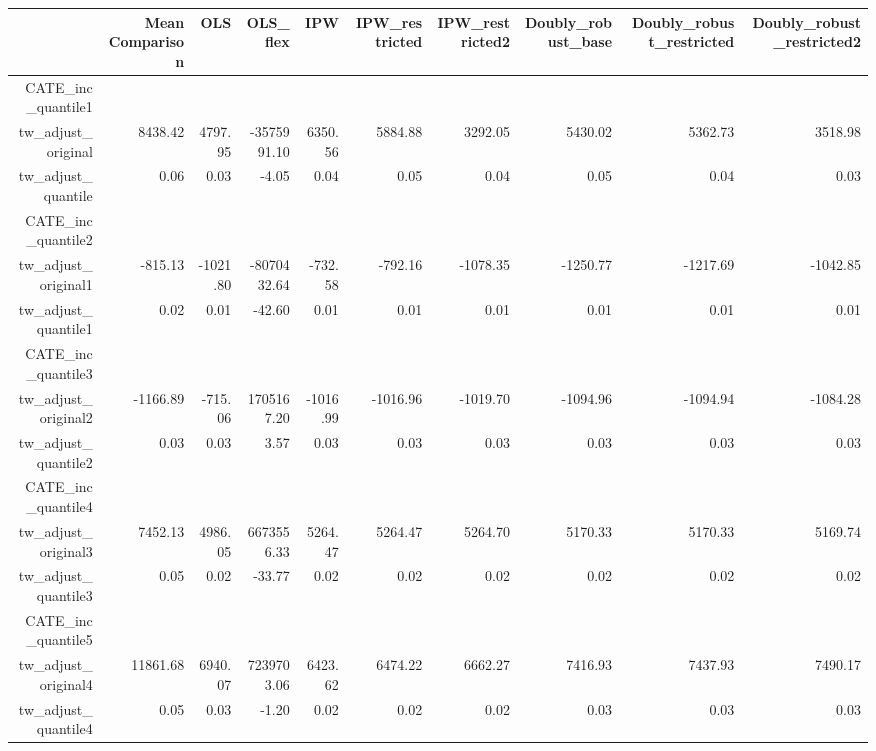 \begin{table}[ht]
\centering
\begin{tabular}{rrrrrrrrrr}
  \hline
 & Mean Comparison & OLS & OLS\_flex & IPW & IPW\_restricted & IPW\_restricted2 & Doubly\_robust\_base & Doubly\_robust\_restricted & Doubly\_robust\_restricted2 \\ 
  \hline
CATE\_inc\_quantile1 &  &  &  &  &  &  &  &  &  \\ 
  tw\_adjust\_original & 8438.42 & 4797.95 & -3575991.10 & 6350.56 & 5884.88 & 3292.05 & 5430.02 & 5362.73 & 3518.98 \\ 
  tw\_adjust\_quantile & 0.06 & 0.03 & -4.05 & 0.04 & 0.05 & 0.04 & 0.05 & 0.04 & 0.03 \\ 
  CATE\_inc\_quantile2 &  &  &  &  &  &  &  &  &  \\ 
  tw\_adjust\_original1 & -815.13 & -1021.80 & -8070432.64 & -732.58 & -792.16 & -1078.35 & -1250.77 & -1217.69 & -1042.85 \\ 
  tw\_adjust\_quantile1 & 0.02 & 0.01 & -42.60 & 0.01 & 0.01 & 0.01 & 0.01 & 0.01 & 0.01 \\ 
  CATE\_inc\_quantile3 &  &  &  &  &  &  &  &  &  \\ 
  tw\_adjust\_original2 & -1166.89 & -715.06 & 1705167.20 & -1016.99 & -1016.96 & -1019.70 & -1094.96 & -1094.94 & -1084.28 \\ 
  tw\_adjust\_quantile2 & 0.03 & 0.03 & 3.57 & 0.03 & 0.03 & 0.03 & 0.03 & 0.03 & 0.03 \\ 
  CATE\_inc\_quantile4 &  &  &  &  &  &  &  &  &  \\ 
  tw\_adjust\_original3 & 7452.13 & 4986.05 & 6673556.33 & 5264.47 & 5264.47 & 5264.70 & 5170.33 & 5170.33 & 5169.74 \\ 
  tw\_adjust\_quantile3 & 0.05 & 0.02 & -33.77 & 0.02 & 0.02 & 0.02 & 0.02 & 0.02 & 0.02 \\ 
  CATE\_inc\_quantile5 &  &  &  &  &  &  &  &  &  \\ 
  tw\_adjust\_original4 & 11861.68 & 6940.07 & 7239703.06 & 6423.62 & 6474.22 & 6662.27 & 7416.93 & 7437.93 & 7490.17 \\ 
  tw\_adjust\_quantile4 & 0.05 & 0.03 & -1.20 & 0.02 & 0.02 & 0.02 & 0.03 & 0.03 & 0.03 \\ 
   \hline
\end{tabular}
\end{table}
